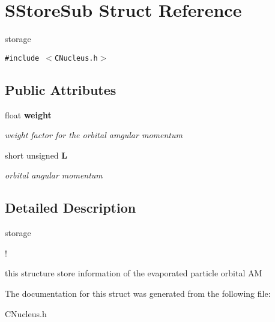 \section{SStore\-Sub Struct Reference}
\label{structSStoreSub}
storage  


{\tt \#include $<$CNucleus.h$>$}

\subsection*{Public Attributes}
\begin{CompactItemize}
\item 
float \bf{weight}\label{structSStoreSub_8d35a45042a21eb929869923913f51b7}

\begin{CompactList}\small\item\em weight factor for the orbital amgular momentum \item\end{CompactList}\item 
short unsigned \bf{L}\label{structSStoreSub_2797f457110b6bfe6d070ea8a3a355ba}

\begin{CompactList}\small\item\em orbital angular momentum \item\end{CompactList}\end{CompactItemize}


\subsection{Detailed Description}
storage 

!

this structure store information of the evaporated particle orbital AM 



The documentation for this struct was generated from the following file:\begin{CompactItemize}
\item 
CNucleus.h\end{CompactItemize}
